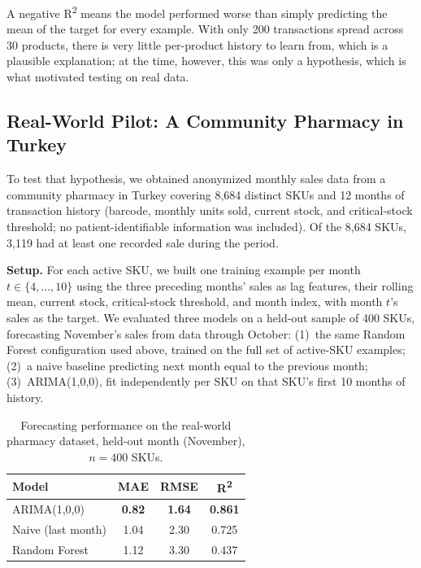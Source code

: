 \documentclass[12pt,a4paper]{article}
\begin{document}
A negative R\textsuperscript{2} means the model performed worse than simply predicting the mean of the target for every example. With only 200 transactions spread across 30 products, there is very little per-product history to learn from, which is a plausible explanation; at the time, however, this was only a hypothesis, which is what motivated testing on real data.

\subsection{Real-World Pilot: A Community Pharmacy in Turkey}
\label{sec:realworld}

To test that hypothesis, we obtained anonymized monthly sales data from a community pharmacy in Turkey covering 8{,}684 distinct SKUs and 12 months of transaction history (barcode, monthly units sold, current stock, and critical-stock threshold; no patient-identifiable information was included). Of the 8{,}684 SKUs, 3{,}119 had at least one recorded sale during the period.

\textbf{Setup.} For each active SKU, we built one training example per month $t \in \{4,\dots,10\}$ using the three preceding months' sales as lag features, their rolling mean, current stock, critical-stock threshold, and month index, with month $t$'s sales as the target. We evaluated three models on a held-out sample of 400 SKUs, forecasting November's sales from data through October: (1)~the same Random Forest configuration used above, trained on the full set of active-SKU examples; (2)~a naive baseline predicting next month equal to the previous month; (3)~ARIMA(1,0,0), fit independently per SKU on that SKU's first 10 months of history.

\begin{table}[H]
\centering
\caption{Forecasting performance on the real-world pharmacy dataset, held-out month (November), $n=400$ SKUs.}
\label{tab:realworld}
\begin{tabular}{lccc}
\toprule
\textbf{Model} & \textbf{MAE} & \textbf{RMSE} & \textbf{R\textsuperscript{2}} \\
\midrule
ARIMA(1,0,0) & \textbf{0.82} & \textbf{1.64} & \textbf{0.861} \\
Naive (last month) & 1.04 & 2.30 & 0.725 \\
Random Forest & 1.12 & 3.30 & 0.437 \\
\bottomrule
\end{tabular}
\end{table}
\end{document}
